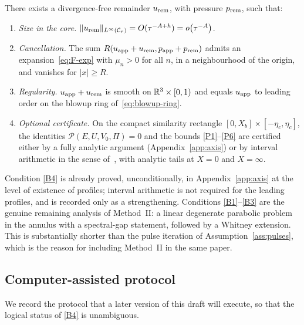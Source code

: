 \begin{assumption}
\label{ass:profile-control}
There exists a divergence-free remainder $u_{\mathrm{rem}}$, with pressure $p_{\mathrm{rem}}$, such that:
\begin{enumerate}[label=\textup{(B\arabic*)}]
\item \label{B1} \emph{Size in the core.} $\|u_{\mathrm{rem}}\|_{L^\infty(\mathcal C_\tau)}=O(\tau^{-A+h})=o\bigl(\tau^{-A}\bigr)$.
\item \label{B2} \emph{Cancellation.} The sum $R(u_{\mathrm{app}}+u_{\mathrm{rem}},p_{\mathrm{app}}+p_{\mathrm{rem}})$ admits an expansion~\eqref{eq:F-exp} with $\mu_n>0$ for all $n$, in a neighbourhood of the origin, and vanishes for $|x|\ge R$.
\item \label{B3} \emph{Regularity.} $u_{\mathrm{app}}+u_{\mathrm{rem}}$ is smooth on $\mathbb{R}^3\times[0,1)$ and equals $u_{\mathrm{app}}$ to leading order on the blowup ring of~\eqref{eq:blowup-ring}.
\item \label{B4} \emph{Optional certificate.} On the compact similarity rectangle $[0,X_b]\times[-\eta_c,\eta_c]$, the identities $\mathcal P(E,U,V_0,\Pi)=0$ and the bounds \ref{P1}--\ref{P6} are certified either by a fully analytic argument (Appendix~\ref{app:axis}) or by interval arithmetic in the sense of~\cite{anandkumar2026,chenhou2022}, with analytic tails at $X=0$ and $X=\infty$.
\end{enumerate}
\end{assumption}

\begin{remark}
\label{rem:assII-status}
Condition \ref{B4} is already proved, unconditionally, in Appendix~\ref{app:axis} at the level of existence of profiles; interval arithmetic is not required for the leading profiles, and is recorded only as a strengthening. Conditions \ref{B1}--\ref{B3} are the genuine remaining analysis of Method~II: a linear degenerate parabolic problem in the annulus with a spectral-gap statement, followed by a {W}hitney extension. This is substantially shorter than the pulse iteration of Assumption~\ref{ass:pulses}, which is the reason for including Method~II in the same paper.
\end{remark}

\subsection{Computer-assisted protocol}
\label{sec:CAP}

We record the protocol that a later version of this draft will execute, so that the logical status of \ref{B4} is unambiguous.


